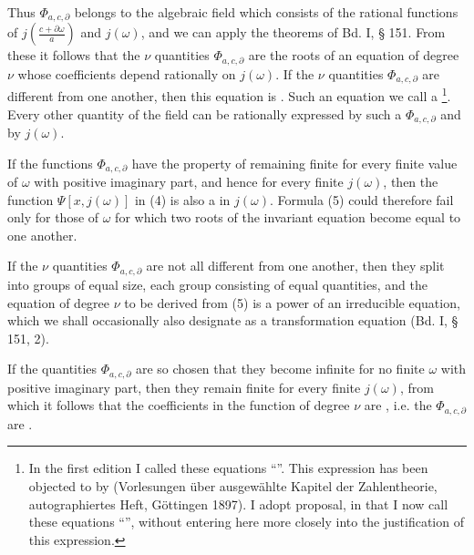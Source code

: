
Thus $\Phi_{a,c,\partial}$ belongs to the algebraic field which consists
of the rational functions of $j\left(\frac{c+\partial\omega}{a}\right)$
and $j(\omega)$, and we can apply the theorems of Bd. I, § 151. From
these it follows that the $\nu$ quantities $\Phi_{a,c,\partial}$ are
the roots of an equation of degree $\nu$ whose coefficients depend
rationally on $j(\omega)$. If the $\nu$ quantities
$\Phi_{a,c,\partial}$ are different from one another, then this
equation is . Such an equation we call a \footnote{In the first edition I called these equations
``''. This expression has
been objected to by  (Vorlesungen über ausgewählte
Kapitel der Zahlentheorie, autographiertes Heft, Göttingen 1897). I
adopt  proposal, in that I now call these equations
``'', without
entering here more closely into the justification of this
expression.}. Every other quantity of the field can be rationally
expressed by such a $\Phi_{a,c,\partial}$ and by $j(\omega)$.

If the functions $\Phi_{a,c,\partial}$ have the property of remaining
finite for every finite value of $\omega$ with positive imaginary
part, and hence for every finite $j(\omega)$, then the function
$\Psi[x,j(\omega)]$ in (4) is also a 
in $j(\omega)$. Formula (5) could therefore fail only for
those  of $\omega$ for which two roots of the
invariant equation become equal to one another.

If the $\nu$ quantities $\Phi_{a,c,\partial}$ are not all different
from one another, then they split into groups of equal size, each group
consisting of equal quantities, and the equation of degree $\nu$ to be derived from (5) is
a power of an irreducible equation, which we shall occasionally also
designate as a transformation equation (Bd. I, § 151, 2).

If the quantities $\Phi_{a,c,\partial}$ are so chosen that they become
infinite for no finite $\omega$ with positive imaginary part, then
they remain finite for every finite $j(\omega)$, from which it follows
that the coefficients in the function of degree $\nu$
are , i.e. the
$\Phi_{a,c,\partial}$ are .
